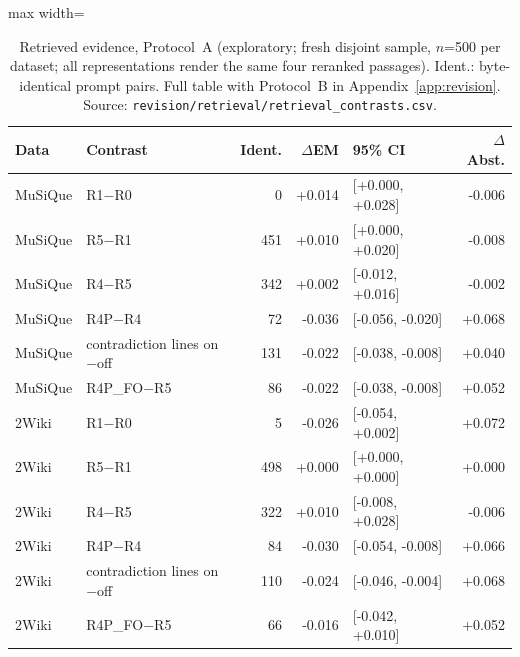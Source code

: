 \begin{table}[t]
\centering
\footnotesize
\begin{adjustbox}{max width=\linewidth}
\begin{tabular}{@{}llrrlr@{}}
\toprule
Data & Contrast & Ident. & $\Delta$EM & 95\% CI & $\Delta$Abst. \\
\midrule
MuSiQue & R1$-$R0 & 0 & +0.014 & [+0.000, +0.028] & -0.006 \\
MuSiQue & R5$-$R1 & 451 & +0.010 & [+0.000, +0.020] & -0.008 \\
MuSiQue & R4$-$R5 & 342 & +0.002 & [-0.012, +0.016] & -0.002 \\
MuSiQue & R4P$-$R4 & 72 & -0.036 & [-0.056, -0.020] & +0.068 \\
MuSiQue & contradiction lines on$-$off & 131 & -0.022 & [-0.038, -0.008] & +0.040 \\
MuSiQue & R4P\_FO$-$R5 & 86 & -0.022 & [-0.038, -0.008] & +0.052 \\
\midrule
2Wiki & R1$-$R0 & 5 & -0.026 & [-0.054, +0.002] & +0.072 \\
2Wiki & R5$-$R1 & 498 & +0.000 & [+0.000, +0.000] & +0.000 \\
2Wiki & R4$-$R5 & 322 & +0.010 & [-0.008, +0.028] & -0.006 \\
2Wiki & R4P$-$R4 & 84 & -0.030 & [-0.054, -0.008] & +0.066 \\
2Wiki & contradiction lines on$-$off & 110 & -0.024 & [-0.046, -0.004] & +0.068 \\
2Wiki & R4P\_FO$-$R5 & 66 & -0.016 & [-0.042, +0.010] & +0.052 \\
\bottomrule
\end{tabular}
\end{adjustbox}
\caption{Retrieved evidence, Protocol~A (exploratory; fresh disjoint sample, $n$=500 per dataset; all representations render the same four reranked passages). Ident.: byte-identical prompt pairs. Full table with Protocol~B in Appendix~\ref{app:revision}. Source: \texttt{revision/\allowbreak retrieval/\allowbreak retrieval\_contrasts.csv}.}
\label{tab:retrieval-main}
\end{table}
